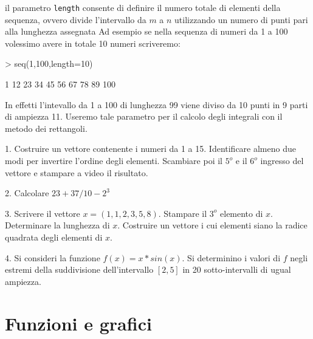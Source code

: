 \documentclass[onecolumn,11pt]{book}
\begin{document}
il parametro \texttt{length}  consente di definire il numero totale di elementi della sequenza, ovvero divide l'intervallo  da $m$ a $n$ utilizzando un numero di punti pari alla lunghezza assegnata Ad esempio se nella  sequenza di numeri da 1 a 100 volessimo avere in totale 10 numeri scriveremo: 
\begin{Schunk}
\begin{Sinput}
> seq(1,100,length=10)
\end{Sinput}
\begin{Soutput}
 [1]   1  12  23  34  45  56  67  78  89 100
\end{Soutput}
\end{Schunk}
In effetti l'intevallo da 1 a 100  di lunghezza 99 viene diviso da 10 punti in 9 parti di ampiezza 11. Useremo tale parametro per il calcolo degli integrali con il metodo dei rettangoli.\\
  \begin{shaded}
  \begin{description}
\item{1.} Costruire un vettore contenente i numeri da 1 a 15. Identificare almeno due modi per invertire l'ordine degli elementi. Scambiare poi  il $5^o$  e il $6^o$ ingresso del vettore e stampare a video il risultato.
\item{2.} Calcolare $23+37/10-2^3$
\item{3.} Scrivere il vettore 
$
x =(1,1,2,3,5,8)$.
Stampare il $3^o$  elemento di $x$. Determinare la lunghezza di $x$. 
Costruire un vettore i cui elementi siano la radice quadrata degli elementi di $x$.
\item{4.} Si consideri la funzione $f(x)=x*sin(x)$. Si determinino i valori di $f$ negli estremi della suddivisione dell'intervallo $[2,5]$  in 20 sotto-intervalli di ugual ampiezza.
\end{description}
\end{shaded}

 \section{Funzioni e grafici}
\end{document}
